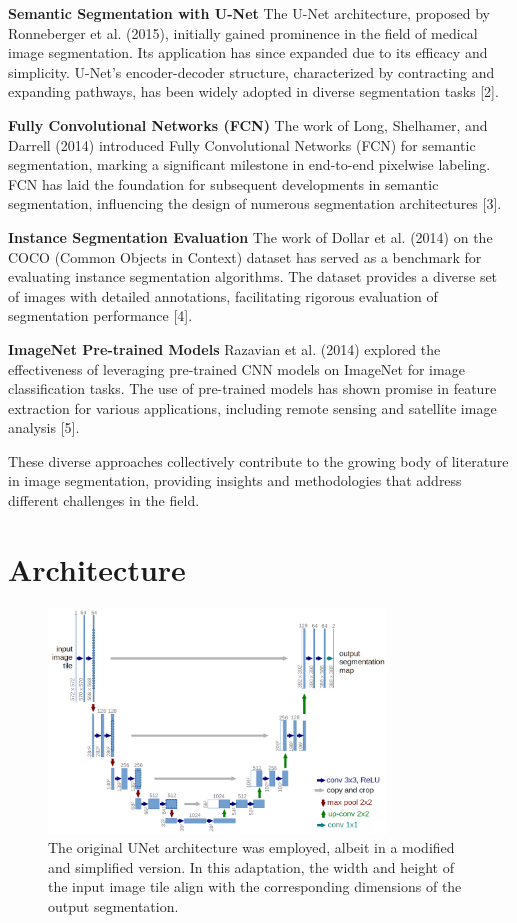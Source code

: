 \documentclass{article}
\begin{document}
\textbf{Semantic Segmentation with U-Net}
The U-Net architecture, proposed by Ronneberger et al. (2015), initially gained prominence
in the field of medical image segmentation. Its application has since expanded due to its
efficacy and simplicity. U-Net's encoder-decoder structure, characterized by contracting
and expanding pathways, has been widely adopted in diverse segmentation tasks [2].

\textbf{Fully Convolutional Networks (FCN)}
The work of Long, Shelhamer, and Darrell (2014) introduced Fully Convolutional Networks (FCN)
for semantic segmentation, marking a significant milestone in end-to-end pixelwise labeling. 
FCN has laid the foundation for subsequent developments in semantic segmentation, influencing
the design of numerous segmentation architectures [3].

\textbf{Instance Segmentation Evaluation}
The work of Dollar et al. (2014) on the COCO (Common Objects in Context) dataset has served as
a benchmark for evaluating instance segmentation algorithms. The dataset provides a diverse
set of images with detailed annotations, facilitating rigorous evaluation of segmentation performance [4].

\textbf{ImageNet Pre-trained Models}
Razavian et al. (2014) explored the effectiveness of leveraging pre-trained CNN models on ImageNet for
image classification tasks. The use of pre-trained models has shown promise in feature extraction for
various applications, including remote sensing and satellite image analysis [5].

These diverse approaches collectively contribute to the growing body of literature in image
segmentation, providing insights and methodologies that address different challenges in the field.


\section{Architecture}


\begin{figure}[!h]
  \centering
  \includegraphics[width=0.8\textwidth]{u-net-architecture}
  \caption{
    The original UNet architecture was employed, albeit in a modified and simplified version.
    In this adaptation, the width and height of the input image tile align with the
    corresponding dimensions of the output segmentation.
  }
  \label{fig:unet}
\end{figure}
\end{document}
